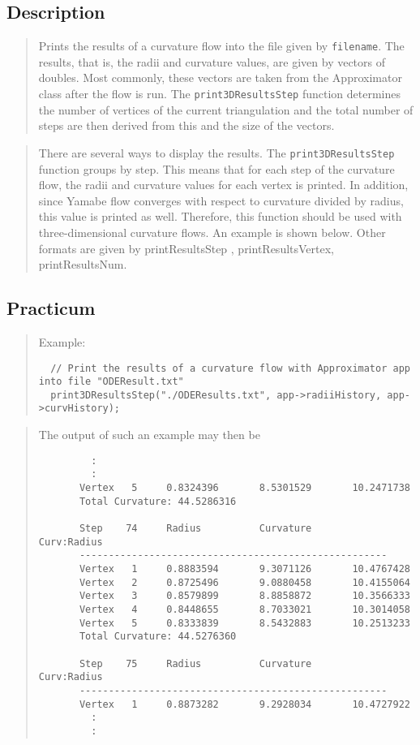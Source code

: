 \documentclass[10pt]{article}%
\begin{document}
\subsection*{Description}

\begin{quotation} Prints the results of a curvature flow into the file given by \texttt{filename}. The results, that is, the radii and curvature values, are given by vectors of doubles. Most commonly, these vectors are taken from the Approximator class after the flow is run. The \texttt{print3DResultsStep} function determines the number of vertices of the current triangulation and the total number of steps are then derived from this and the size of the vectors.\end{quotation}
\begin{quotation} There are several ways to display the results. The \texttt{print3DResultsStep} function groups by step. This means that for each step of the curvature flow, the radii and curvature values for each vertex is printed. In addition, since Yamabe flow converges with respect to curvature divided by radius, this value is printed as well. Therefore, this function should be used with three-dimensional curvature flows. An example is shown below. Other formats are given by printResultsStep , printResultsVertex, printResultsNum.\end{quotation}

\subsection*{Practicum}

\begin{quotation} Example:{\small{\begin{verbatim} 
  // Print the results of a curvature flow with Approximator app into file "ODEResult.txt"
  print3DResultsStep("./ODEResults.txt", app->radiiHistory, app->curvHistory);
  \end{verbatim}
}}
\end{quotation}\begin{quotation} The output of such an example may then be{\small{\begin{verbatim}       
         :
         :
       Vertex   5     0.8324396       8.5301529       10.2471738
       Total Curvature: 44.5286316

       Step    74     Radius          Curvature        Curv:Radius
       -----------------------------------------------------
       Vertex   1     0.8883594       9.3071126       10.4767428
       Vertex   2     0.8725496       9.0880458       10.4155064
       Vertex   3     0.8579899       8.8858872       10.3566333
       Vertex   4     0.8448655       8.7033021       10.3014058
       Vertex   5     0.8333839       8.5432883       10.2513233
       Total Curvature: 44.5276360

       Step    75     Radius          Curvature        Curv:Radius
       -----------------------------------------------------
       Vertex   1     0.8873282       9.2928034       10.4727922
         :
         :
  \end{verbatim}
}}
\end{quotation}
\end{document}
